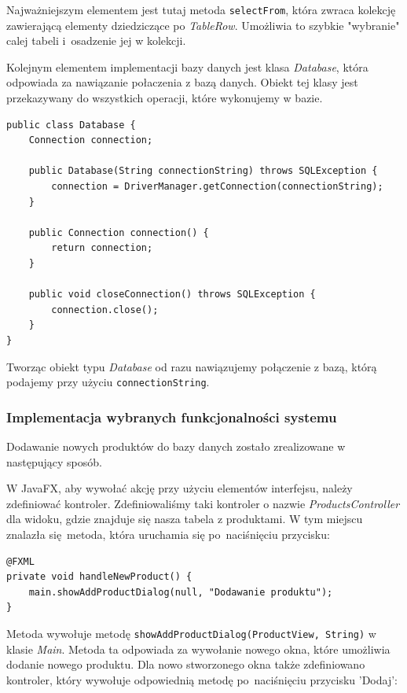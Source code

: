 Najważniejszym elementem jest tutaj metoda \lstinline|selectFrom|, która zwraca kolekcję zawierającą elementy dziedziczące po \emph{TableRow}. Umożliwia to szybkie "wybranie" calej tabeli i~osadzenie jej w kolekcji.

Kolejnym elementem implementacji bazy danych jest klasa \emph{Database}, która odpowiada za nawiązanie połaczenia z bazą danych. Obiekt tej klasy jest przekazywany do wszystkich operacji, które wykonujemy w bazie.

\begin{lstlisting}[style=Java]
public class Database {
	Connection connection;

	public Database(String connectionString) throws SQLException {
		connection = DriverManager.getConnection(connectionString);
	}

	public Connection connection() {
		return connection;
	}

	public void closeConnection() throws SQLException {
		connection.close();
	}
}
\end{lstlisting}

Tworząc obiekt typu \emph{Database} od razu nawiązujemy połączenie z bazą, którą podajemy przy użyciu \lstinline|connectionString|.

\subsubsection{Implementacja wybranych funkcjonalności systemu}

Dodawanie nowych produktów do bazy danych zostało zrealizowane w następujący sposób.

W JavaFX, aby wywołać akcję przy użyciu elementów interfejsu, należy zdefiniować kontroler. Zdefiniowaliśmy taki kontroler o nazwie \emph{ProductsController} dla widoku, gdzie znajduje się nasza tabela z produktami. W tym miejscu znalazła się metoda, która uruchamia się po~naciśnięciu przycisku:

\begin{lstlisting}[style=Java]
@FXML
private void handleNewProduct() {
	main.showAddProductDialog(null, "Dodawanie produktu");
}
\end{lstlisting}

Metoda wywołuje metodę \lstinline[style=Java]|showAddProductDialog(ProductView, String)| w klasie \emph{Main}. Metoda ta odpowiada za wywołanie nowego okna, które umożliwia dodanie nowego produktu. Dla nowo stworzonego okna także zdefiniowano kontroler, który wywołuje odpowiednią metodę po~naciśnięciu przycisku 'Dodaj':


